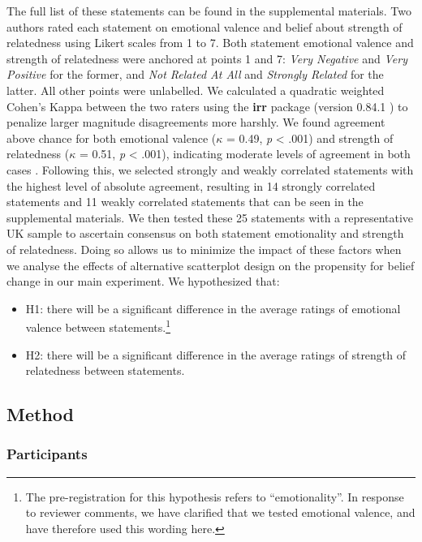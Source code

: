 \documentclass[sigconf]{acmart}
\providecommand{\tightlist}{%
  \setlength{\itemsep}{0pt}\setlength{\parskip}{0pt}}\usepackage{longtable,booktabs,array}
\begin{document}
The full list of these statements can be found in the supplemental
materials. Two authors rated each statement on emotional valence and
belief about strength of relatedness using Likert scales from 1 to 7.
Both statement emotional valence and strength of relatedness were
anchored at points 1 and 7: \emph{Very Negative} and \emph{Very
Positive} for the former, and \emph{Not Related At All} and
\emph{Strongly Related} for the latter. All other points were
unlabelled. We calculated a quadratic weighted Cohen's Kappa between the
two raters using the \textbf{irr} package (version 0.84.1 \citep{irr})
to penalize larger magnitude disagreements more harshly. We found
agreement above chance for both emotional valence (\(\kappa\) = 0.49,
\emph{p} \textless{} .001) and strength of relatedness (\(\kappa\) =
0.51, \emph{p} \textless{} .001), indicating moderate levels of
agreement in both cases \citep{cohen_1968, fleiss_1969}. Following this,
we selected strongly and weakly correlated statements with the highest
level of absolute agreement, resulting in 14 strongly correlated
statements and 11 weakly correlated statements that can be seen in the
supplemental materials. We then tested these 25 statements with a
representative UK sample to ascertain consensus on both statement
emotionality and strength of relatedness. Doing so allows us to minimize
the impact of these factors when we analyse the effects of alternative
scatterplot design on the propensity for belief change in our main
experiment. We hypothesized that:

\begin{itemize}
\tightlist
\item
  H1: there will be a significant difference in the average ratings of
  emotional valence between statements.\footnote{The pre-registration
    for this hypothesis refers to ``emotionality''. In response to
    reviewer comments, we have clarified that we tested emotional
    valence, and have therefore used this wording here.}
\item
  H2: there will be a significant difference in the average ratings of
  strength of relatedness between statements.
\end{itemize}

\subsection{Method}\label{sec-method-pre}

\subsubsection{Participants}\label{sec-participants-pre}
\end{document}
